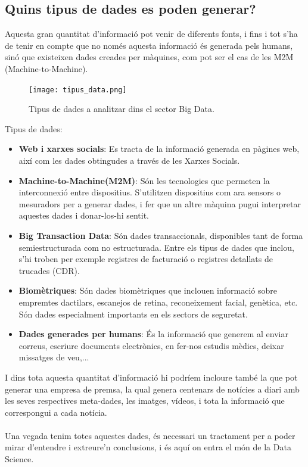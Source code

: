 \documentclass[12pt,a4paper,openright,oneside]{article}
\numberwithin{equation}{section}
\theoremstyle{definition}
\begin{document}
\subsection*{Quins tipus de dades es poden generar?}
Aquesta gran quantitat d'informació pot venir de diferents fonts, i fins i tot s'ha de tenir en compte que no només aquesta informació és generada pels humans, sinó que existeixen dades creades per màquines, com pot ser el cas de les M2M (Machine-to-Machine).
\begin{figure}[htbp]
\centering
\texttt{[image: tipus\_data.png]}
\caption{Tipus de dades a analitzar dins el sector Big Data.\cite{datascienceVenn}}
\end{figure}
Tipus de dades:
\begin{itemize}
\item \textbf{Web i xarxes socials}: Es tracta de la informació generada en pàgines web, així com les dades obtingudes a través de les Xarxes Socials.
\item \textbf{Machine-to-Machine(M2M)}: Són les tecnologies que permeten la interconnexió entre dispositius. S'utilitzen dispositius com ara sensors o mesuradors per a generar dades, i fer que un altre màquina pugui interpretar aquestes dades i donar-los-hi sentit.
\item \textbf{Big Transaction Data}: Són dades transaccionals, disponibles tant de forma semiestructurada com no estructurada. Entre els tipus de dades que inclou, s'hi troben per exemple registres de facturació o registres detallats de trucades (CDR).
\item \textbf{Biomètriques}: Són dades biomètriques que inclouen informació sobre empremtes dactilars, escanejos de retina, reconeixement facial, genètica, etc. Són dades especialment importants en els sectors de seguretat. 
\item \textbf{Dades generades per humans}: És la informació que generem al enviar correus, escriure documents electrònics, en fer-nos estudis mèdics, deixar missatges de veu,... 
\end{itemize}
I dins tota aquesta quantitat d'informació hi podríem incloure també la que pot generar una empresa de premsa, la qual genera centenars de notícies a diari amb les seves respectives meta-dades, les imatges, vídeos, i tota la informació que correspongui a cada notícia\cite{BigData}.\\\\
Una vegada tenim totes aquestes dades, és necessari un tractament per a poder mirar d'entendre i extreure'n conclusions, i és aquí on entra el món de la Data Science.
\end{document}
